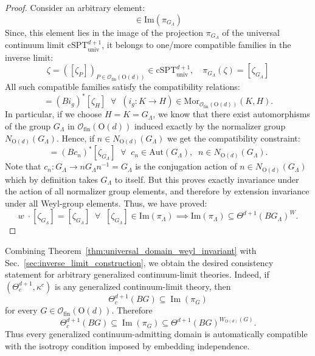 \documentclass[aps,prx,reprint,superscriptaddress,twocolumn,amsmath,amssymb,amsfonts, nofootinbib]{revtex4-2}
\newcommand{\csptu}{\mathrm{cSPT}^{d+1}_{\mathrm{univ}}}
\newcommand{\ofin}{\mathcal{O}_{\text{fin}}}
\theoremstyle{apsstyle}
\begin{document}
\begin{proof} Consider an arbitrary element: 
\begin{equation*}
    [\zeta_{G_\Lambda}]\in \mathrm{Im}(\pi_{G_\Lambda})
\end{equation*}
Since, this element lies in the image of the projection $\pi_{G_\Lambda}$ of the universal continuum limit $\csptu$, it belongs to one/more compatible families in the inverse limit:
\begin{equation*}
    \zeta=([\zeta_{P}])_{P\in \ofin(\mathrm{O}(d))}\in \csptu, \quad \pi_{G_\Lambda}(\zeta)=[\zeta_{G_{\Lambda}}]
\end{equation*}
All such compatible families satisfy the compatibility relations:
\begin{equation*}
    [\zeta_{K}]=(Bi_{g})^{*}[\zeta_{H}]\;\;\forall\;\; (i_{g}:K \to H) \in \mathrm{Mor}_{\ofin(\mathrm{O}(d))}(K,H).
\end{equation*}
In particular, if we choose $H=K=G_{\Lambda}$, we know that there exist automorphisms of the group $G_{\Lambda}$ in $\ofin(\mathrm{O}(d))$ induced exactly by the normalizer group $N_{\mathrm{O}(d)}(G_{\Lambda})$. Hence, if $n\in N_{\mathrm{O}(d)}(G_{\Lambda})$ we get the compatibility constraint:
\begin{equation*}
    [\zeta_{G_{\Lambda}}]=(Bc_{n})^{*}[\zeta_{G_{\Lambda}}]\;\;\forall\;\; c_{n} \in \mathrm{Aut}(G_{\Lambda}),\;\; n\in N_{\mathrm{O}(d)}(G_{\Lambda}).
\end{equation*}
Note that $c_{n}:G_{\Lambda} \to nG_{\Lambda}n^{-1}=G_{\Lambda}$ is the conjugation action of $n\in N_{\mathrm{O}(d)}(G_{\Lambda})$ which by definition takes $G_{\Lambda}$ to itself. But this proves exactly invariance under the action of all normalizer group elements, and therefore by extension invariance under all Weyl-group elements. Thus, we have proved:
\begin{equation*}
    w\;\cdot [\zeta_{G_{\Lambda}}]=[\zeta_{G_{\Lambda}}] \;\;\forall \;\;[\zeta_{G_{\Lambda}}]\in \mathrm{Im}(\pi_{\Lambda}) \implies \mathrm{Im}(\pi_{\Lambda})\subseteq \Theta^{d+1}(BG_{\Lambda})^{W}.
\end{equation*}
\end{proof}

Combining Theorem~\ref{thm:universal_domain_weyl_invariant} with Sec.~\ref{sec:inverse_limit_construction}, we obtain the desired consistency statement for arbitrary generalized continuum-limit theories. Indeed, if $(\Theta^{d+1}_{c},\kappa^c)$ is any generalized continuum-limit theory, then 
\begin{equation*} 
\Theta^{d+1}_{c}(BG) \subseteq \operatorname{Im}(\pi_G) 
\end{equation*} 
for every $G\in\ofin(\mathrm{O}(d))$. Therefore 
\begin{equation*} 
\Theta^{d+1}_{c}(BG) \subseteq \operatorname{Im}(\pi_G) \subseteq \Theta^{d+1}(BG)^{W_{\mathrm{O}(d)}(G)}. 
\end{equation*} 
Thus every generalized continuum-admitting domain is automatically compatible with the isotropy condition imposed by embedding independence.
\end{document}
